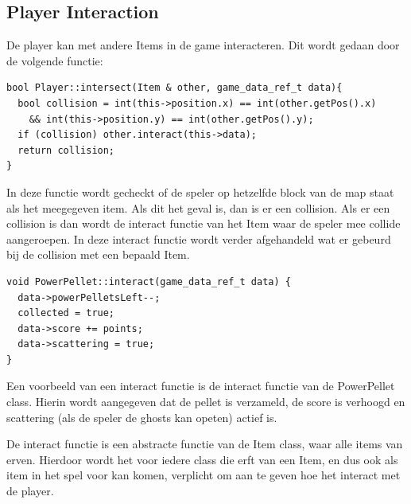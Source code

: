\documentclass{report}
\begin{document}
    \subsection{Player Interaction} %
    \label{sub:player_interaction}
    De player kan met andere Items in de game interacteren. Dit wordt gedaan door de volgende functie:
    \begin{verbatim}
bool Player::intersect(Item & other, game_data_ref_t data){
  bool collision = int(this->position.x) == int(other.getPos().x)
    && int(this->position.y) == int(other.getPos().y);
  if (collision) other.interact(this->data);
  return collision;
}
    \end{verbatim}

    In deze functie wordt gecheckt of de speler op hetzelfde block van de map staat als het meegegeven item. Als dit het geval is, dan is er een collision. Als er een collision is dan wordt de interact functie van het Item waar de speler mee collide aangeroepen. In deze interact functie wordt verder afgehandeld wat er gebeurd bij de collision met een bepaald Item.
    \begin{verbatim}
void PowerPellet::interact(game_data_ref_t data) {
  data->powerPelletsLeft--;
  collected = true;
  data->score += points;
  data->scattering = true;
}
    \end{verbatim}
    Een voorbeeld van een interact functie is de interact functie van de PowerPellet class. Hierin wordt aangegeven dat de pellet is verzameld, de score is verhoogd en scattering (als de speler de ghosts kan opeten) actief is.

    De interact functie is een abstracte functie van de Item class, waar alle items van erven. Hierdoor wordt het voor iedere class die erft van een Item, en dus ook als item in het spel voor kan komen, verplicht om aan te geven hoe het interact met de player.
\end{document}
